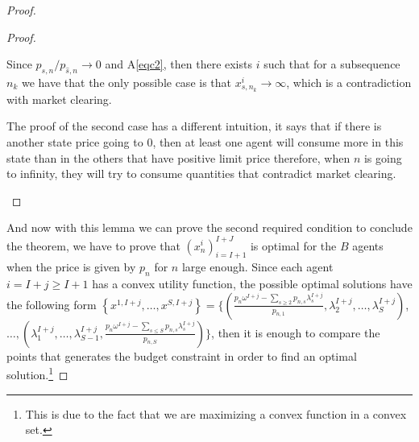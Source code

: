\documentclass[pdftex]{article}
\numberwithin{equation}{section}
\theoremstyle{th}
\newtheorem{proof lemma}{{Proof Lemma}.}
\theoremstyle{definition}
\newtheorem*{risk lovers}{Risk lovers}
\newtheorem*{risk averse}{Risk averse}
\begin{document}
{\begin{proof}
\begin{proof}
\begin{enumerate}
Since ${p_{s,n}}/{p_{\hat{s},n}}\rightarrow0$ and A\ref{eqc2}, then there exists $i$ such that for a subsequence $n_k$ we have that the only possible case is that $x^{i}_{s,n_k}\rightarrow\infty$, which is a contradiction with market clearing.

%
%

The proof of the second case has a different intuition, it says that if there is another state price going to $0$, then at least one agent will consume more in this state than in the others that have positive limit price therefore, when $n$ is going to infinity, they will try to consume quantities that contradict market clearing.

\end{enumerate}
\end{proof}
And now with this lemma we can prove the second required condition to conclude the theorem, we have to prove that $\left(x^i_n\right)_{i=I+1}^{I+J}$ is optimal for the $B$ agents when the price is given by $p_n$ for $n$ large enough. Since each agent $i=I+j\geq{I+1}$ has a convex utility function, the possible optimal solutions have the following form $\left\{x^{1,I+j},\dots,x^{S,I+j}\right\}=\!\Bigg\{\!\!\left(\!\!\frac{p_n\omega^{I+j}\!-\!\sum_{s\geq2}\!p_{n,s}\lambda_s^{I+j}\!\!}{p_{n,1}},\lambda_2^{I+j}\!\!\!\!,\dots,\lambda_S^{I+j}\!\!\!\right)$, $\dots,\left(\!\!\lambda_1^{I+j}\!\!\!\!,\dots,\!\lambda_{S-1}^{I+j}\!,\!\frac{p_n\omega^{I+j}\!\!-\!\!\sum_{s\leq{S}}\!p_{n,s}\lambda_s^{I+j}\!}{p_{n,S}}\!\right)\!\!\Bigg\}$,
then it is enough to compare the points that generates the budget constraint in order to find an optimal solution.\footnote{This is due to the fact that we are maximizing a convex function in a convex set.}


\end{proof}}
\end{document}
